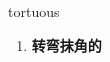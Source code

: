 
\begin{frame}
{\huge tortuous}
\begin{center}
\begin{enumerate}\Large
  \item \textbf{转弯抹角的}
\end{enumerate}
\end{center}
\end{frame}
